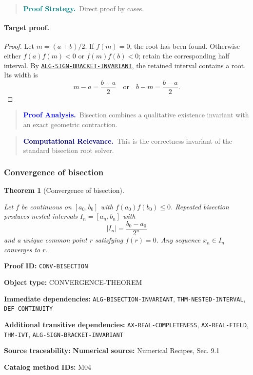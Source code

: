 \documentclass[10pt]{article}
\newcommand{\pidraw}[1]{\begingroup\urlstyle{tt}\nolinkurl{#1}\endgroup}
\newcommand{\pidref}[1]{\hyperref[prf:#1]{\pidraw{#1}}}
\newcommand{\pid}[1]{\pidref{#1}}
\newtheorem{theorem}{Theorem}[section]
\theoremstyle{definition}
\theoremstyle{remark}
\newenvironment{proofstrategy}
{\begin{quote}\small\noindent\textbf{\textcolor{teal}{Proof Strategy.}}\ }
{\end{quote}}
\newenvironment{proofanalysis}
{\begin{quote}\small\noindent\textbf{\textcolor{blue}{Proof Analysis.}}\ }
{\end{quote}}
\newenvironment{computationalrelevance}
{\begin{quote}\small\noindent\textbf{\textcolor{navy}{Computational Relevance.}}\ }
{\end{quote}}
\newcommand{\meta}[2]{\noindent\textbf{#1:} #2\par}
\begin{document}
\begin{proofstrategy}Direct proof by cases.\end{proofstrategy}

\paragraph{Target proof.}

\begin{proof}

Let $m=(a+b)/2$. If $f(m)=0$, the root has been found. Otherwise either
$f(a)f(m)<0$ or $f(m)f(b)<0$; retain the corresponding half interval.
By \pid{ALG-SIGN-BRACKET-INVARIANT}, the retained interval contains a root.
Its width is
\[
m-a=\frac{b-a}{2}
\quad\text{or}\quad
b-m=\frac{b-a}{2}.
\]

\end{proof}

\begin{proofanalysis}Bisection combines a qualitative existence invariant with an exact geometric contraction.\end{proofanalysis}

\begin{computationalrelevance}This is the correctness invariant of the standard bisection root solver.\end{computationalrelevance}

\subsubsection{Convergence of bisection}

\begin{theorem}[Convergence of bisection]\label{prf:CONV-BISECTION}

Let $f$ be continuous on $[a_0,b_0]$ with $f(a_0)f(b_0)\le0$. Repeated bisection produces nested intervals $I_n=[a_n,b_n]$ with
\[
|I_n|=\frac{b_0-a_0}{2^n}
\]
and a unique common point $r$ satisfying $f(r)=0$. Any sequence $x_n\in I_n$ converges to $r$.

\end{theorem}

\meta{Proof ID}{\pidraw{CONV-BISECTION}}
\meta{Object type}{CONVERGENCE-THEOREM}
\meta{Immediate dependencies}{\pidraw{ALG-BISECTION-INVARIANT}, \pidraw{THM-NESTED-INTERVAL}, \pidraw{DEF-CONTINUITY}}
\meta{Additional transitive dependencies}{\pidraw{AX-REAL-COMPLETENESS}, \pidraw{AX-REAL-FIELD}, \pidraw{THM-IVT}, \pidraw{ALG-SIGN-BRACKET-INVARIANT}}
\meta{Source traceability}{\textbf{Numerical source:} Numerical Recipes, Sec. 9.1}
\meta{Catalog method IDs}{M04}
\end{document}

